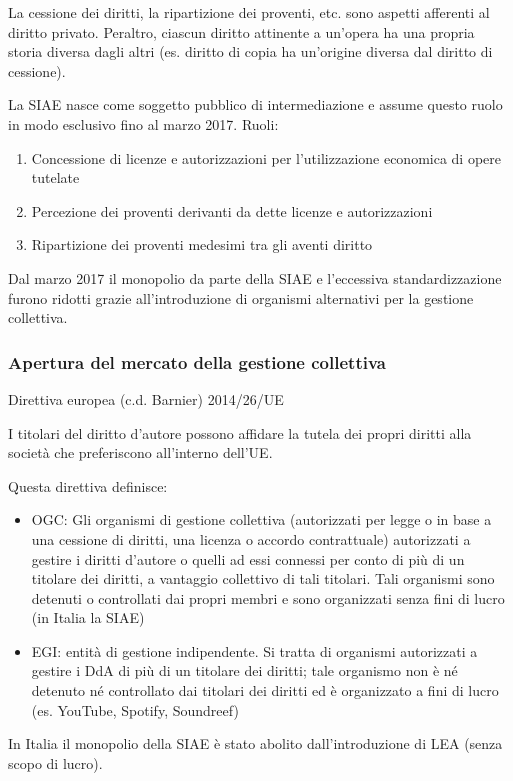La cessione dei diritti, la ripartizione dei proventi, etc. sono aspetti afferenti al diritto privato. Peraltro, ciascun diritto attinente a un'opera ha una propria storia diversa dagli altri (es. diritto di copia ha un'origine diversa dal diritto di cessione). 

La SIAE nasce come soggetto pubblico di intermediazione e assume questo ruolo in modo esclusivo fino al marzo 2017.
Ruoli:
\begin{enumerate}
    \item Concessione di licenze e autorizzazioni per l'utilizzazione economica di opere tutelate
    \item Percezione dei proventi derivanti da dette licenze e autorizzazioni
    \item Ripartizione dei proventi medesimi tra gli aventi diritto
\end{enumerate}

Dal marzo 2017 il monopolio da parte della SIAE e l'eccessiva standardizzazione furono ridotti grazie all'introduzione di organismi alternativi per la gestione collettiva.

\subsubsection{Apertura del mercato della gestione collettiva}
Direttiva europea (c.d. Barnier) 2014/26/UE

I titolari del diritto d'autore possono affidare la tutela dei propri diritti alla società che preferiscono all'interno dell'UE. 

Questa direttiva definisce:
\begin{itemize}
    \item OGC: Gli organismi di gestione collettiva (autorizzati per legge o in base a una cessione di diritti, una licenza o accordo contrattuale) autorizzati a gestire i diritti d'autore o quelli ad essi connessi per conto di più di un titolare dei diritti, a vantaggio collettivo di tali titolari. Tali organismi sono detenuti o controllati dai propri membri e sono organizzati senza fini di lucro (in Italia la SIAE)
    \item EGI: entità di gestione indipendente. Si tratta di organismi autorizzati a gestire i DdA di più di un titolare dei diritti; tale organismo non è né detenuto né controllato dai titolari dei diritti ed è organizzato a fini di lucro (es. YouTube, Spotify, Soundreef)
\end{itemize}

In Italia il monopolio della SIAE è stato abolito dall'introduzione di LEA (senza scopo di lucro).

